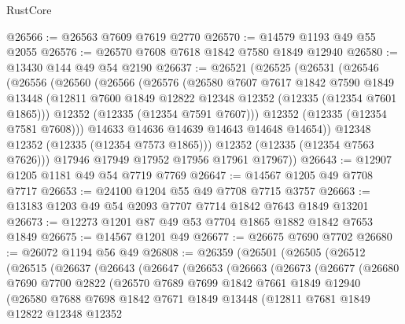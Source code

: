 \begin{lexlean}{RustCore}
\begin{coremodule}
@26566 := @26563 @7609 @7619 @2770
@26570 := @14579 @1193 @49 @55 @2055
@26576 := @26570 @7608 @7618 @1842 @7580 @1849 @12940
@26580 := @13430 @144 @49 @54 @2190
@26637 := @26521
    (@26525
      (@26531
        (@26546
          (@26556
            (@26560
              (@26566
                (@26576
                  (@26580
                    @7607
                    @7617
                    @1842
                    @7590
                    @1849
                    @13448
                    (@12811 @7600 @1849 @12822 @12348 @12352 (@12335 (@12354 @7601 @1865)))
                    @12352
                    (@12335 (@12354 @7591 @7607)))
                  @12352
                  (@12335 (@12354 @7581 @7608)))
                @14633
                @14636
                @14639
                @14643
                @14648
                @14654))
            @12348
            @12352
            (@12335 (@12354 @7573 @1865)))
          @12352
          (@12335 (@12354 @7563 @7626)))
        @17946
        @17949
        @17952
        @17956
        @17961
        @17967))
@26643 := @12907 @1205 @1181 @49 @54 @7719 @7769
@26647 := @14567 @1205 @49 @7708 @7717
@26653 := @24100 @1204 @55 @49 @7708 @7715 @3757
@26663 := @13183 @1203 @49 @54 @2093 @7707 @7714 @1842 @7643 @1849 @13201
@26673 := @12273 @1201 @87 @49 @53 @7704 @1865 @1882 @1842 @7653 @1849
@26675 := @14567 @1201 @49
@26677 := @26675 @7690 @7702
@26680 := @26072 @1194 @56 @49
@26808 := @26359
    (@26501
      (@26505
        (@26512
          (@26515
            (@26637
              (@26643
                (@26647
                  (@26653
                    (@26663
                      (@26673
                        (@26677
                          (@26680
                            @7690
                            @7700
                            @2822
                            (@26570
                              @7689
                              @7699
                              @1842
                              @7661
                              @1849
                              @12940
                              (@26580
                                @7688
                                @7698
                                @1842
                                @7671
                                @1849
                                @13448
                                (@12811
                                  @7681
                                  @1849
                                  @12822
                                  @12348
                                  @12352

\end{coremodule}
\end{lexlean}
